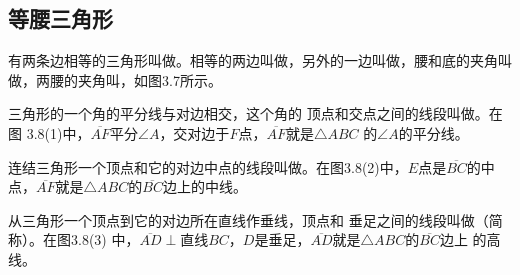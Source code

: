 \subsection{等腰三角形}

\begin{Definition}
有两条边相等的三角形叫做。相等的两边叫做，另外的一边叫做，腰和底的夹角叫做，两腰的夹角叫，如图3.7所示。
\end{Definition}

\begin{Definition}
三角形的一个角的平分线与对边相交，这个角的
顶点和交点之间的线段叫做。在图
3.8(1)中，$\overline{AF}$平分$\angle A$，交对边于$F$点，$\overline{AF}$就是$\triangle ABC$
的$\angle A$的平分线。  

连结三角形一个顶点和它的对边中点的线段叫做。在图3.8(2)中，$E$点是$\overline{BC}$的中点，$\overline{AF}$就是$\triangle ABC$的$\overline{BC}$边上的中线。

从三角形一个顶点到它的对边所在直线作垂线，顶点和
垂足之间的线段叫做（简称）。在图3.8(3)
中，$\overline{AD}\perp$直线$BC$，$D$是垂足，$\overline{AD}$就是$\triangle ABC$的$\overline{BC}$边上
的高线。
\end{Definition}

\begin{figure}
    \centering
\begin{tikzpicture}[scale=.8]

\end{tikzpicture}
    \caption{}
\end{figure}

